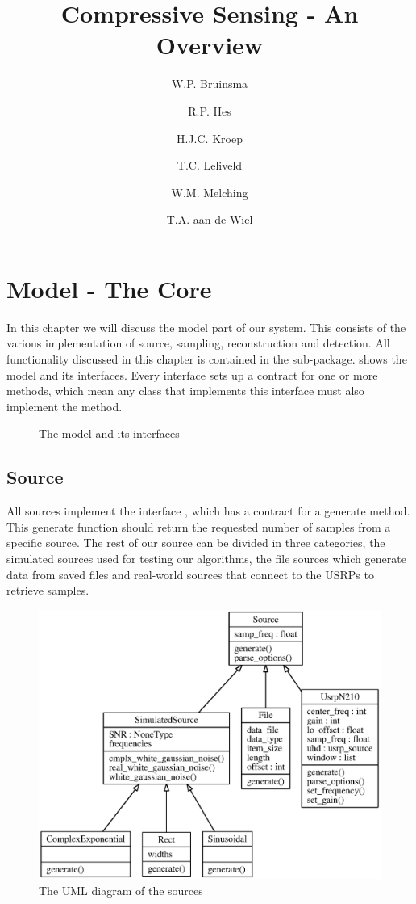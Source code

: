 \documentclass[a4paper, openany, oneside]{memoir}
\title{Compressive Sensing - An Overview}
\author{W.P. Bruinsma \and R.P. Hes \and H.J.C. Kroep \and T.C. Leliveld \and W.M. Melching \and T.A. aan de Wiel}
\begin{document}
\chapter{Model - The Core}
\label{cha:model}
In this chapter we will discuss the model part of our system. This consists of the various implementation of source, sampling, reconstruction and detection. All functionality discussed in this chapter is contained in the  sub-package.  shows the model and its interfaces. Every interface sets up a contract for one or more methods, which mean any class that implements this interface must also implement the method.

\begin{figure}
    \centering
    \begin{adjustbox}{width=\textwidth}
    
    \end{adjustbox}
    \caption{The model and its interfaces}
    \label{fig:model-diagram}
\end{figure}


\section{Source}
\label{sec:source}
All sources implement the interface , which has a contract for a generate method. This generate function should return the requested number of samples from a specific source. The rest of our source can be divided in three categories, the simulated sources used for testing our algorithms, the file sources which generate data from saved files and real-world sources that connect to the USRPs to retrieve samples.

\begin{figure}
    \centering
    \includegraphics[width=\linewidth]{figures/classes_source.eps}
    \caption{The UML diagram of the sources}
    \label{fig:umlsource}
\end{figure}
\end{document}
